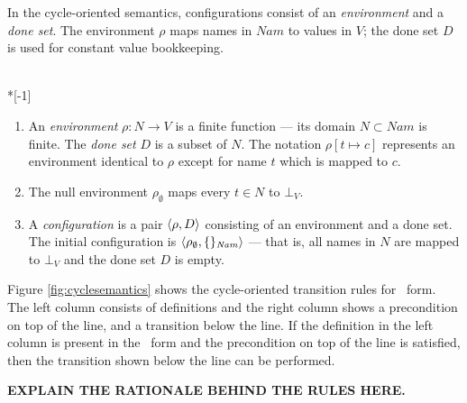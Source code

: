 \documentclass[12pt,notitlepage,twoside]{article}
\begin{document}
In the cycle-oriented semantics, configurations consist of an
\emph{environment} and a \emph{done set}.  The environment $\rho$ maps
names in $\mathit{Nam}$ to values in $V$; the done set $D$ is used for constant
value bookkeeping.

\begin{definition}~\\*[-1\baselineskip]
\begin{enumerate}
\item An \emph{environment} $\rho: N \to V$ is a finite function ---
its domain $N \subset \mathit{Nam}$ is finite.  The \emph{done set}
$D$ is a subset of $N$.
The notation $\rho[t\mapsto c]$ represents an environment
identical to $\rho$ except for name $t$ which is mapped to $c$.
\item The null environment $\rho_\emptyset$ maps every $t\in N$ to
$\bot_V$.
\item A \emph{configuration} is a pair $\left\langle \rho,D \right\rangle$ consisting of
an environment and a done set.  The initial configuration is
$\left\langle \rho_\emptyset, \{\}_{\mathit{Nam}} \right\rangle$ ---
that is, all names in $N$ are
mapped to $\bot_V$ and the done set $D$ is empty.
\end{enumerate}
\end{definition}

Figure \ref{fig:cyclesemantics} shows the cycle-oriented transition
rules for \ssiplus\ form.  The left column consists of definitions and
the right column shows a precondition on top of the line, and a
transition below the line.  If the definition in the left column is
present in the \ssiplus\ form and the precondition on top of the line
is satisfied, then the transition shown below the line can be performed.

\textbf{EXPLAIN THE RATIONALE BEHIND THE RULES HERE.}
\end{document}

